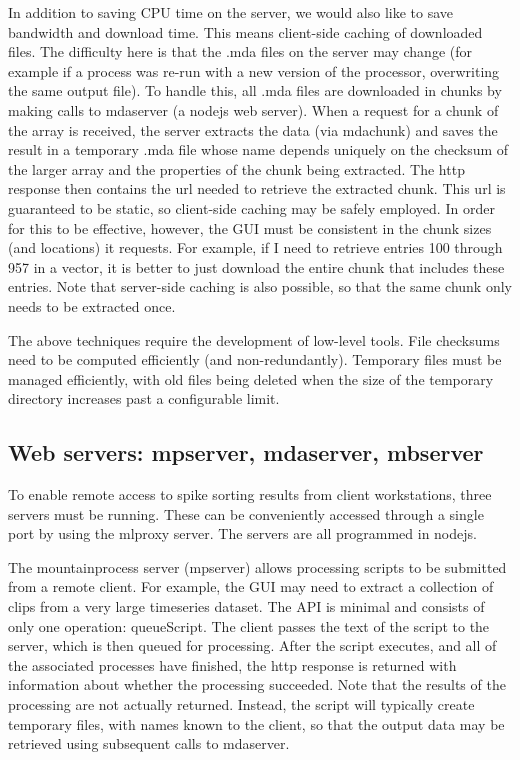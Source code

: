 \documentclass{article}
\begin{document}
In addition to saving CPU time on the server, we would also like to save bandwidth and download time. This means client-side caching of downloaded files. The difficulty here is that the .mda files on the server may change (for example if a process was re-run with a new version of the processor, overwriting the same output file). To handle this, all .mda files are downloaded in chunks by making calls to mdaserver (a nodejs web server). When a request for a chunk of the array is received, the server extracts the data (via mdachunk) and saves the result in a temporary .mda file whose name depends uniquely on the checksum of the larger array and the properties of the chunk being extracted. The http response then contains the url needed to retrieve the extracted chunk. This url is guaranteed to be static, so client-side caching may be safely employed. In order for this to be effective, however, the GUI must be consistent in the chunk sizes (and locations) it requests. For example, if I need to retrieve entries 100 through 957 in a vector, it is better to just download the entire chunk that includes these entries. Note that server-side caching is also possible, so that the same chunk only needs to be extracted once.

The above techniques require the development of low-level tools. File checksums need to be computed efficiently (and non-redundantly). Temporary files must be managed efficiently, with old files being deleted when the size of the temporary directory increases past a configurable limit.

\subsection{Web servers: mpserver, mdaserver, mbserver}

To enable remote access to spike sorting results from client workstations, three servers must be running. These can be conveniently accessed through a single port by using the mlproxy server. The servers are all programmed in nodejs.

The mountainprocess server (mpserver) allows processing scripts to be submitted from a remote client. For example, the GUI may need to extract a collection of clips from a very large timeseries dataset. The API is minimal and consists of only one operation: queueScript. The client passes the text of the script to the server, which is then queued for processing. After the script executes, and all of the associated processes have finished, the http response is returned with information about whether the processing succeeded. Note that the results of the processing are not actually returned. Instead, the script will typically create temporary files, with names known to the client, so that the output data may be retrieved using subsequent calls to mdaserver.
\end{document}
